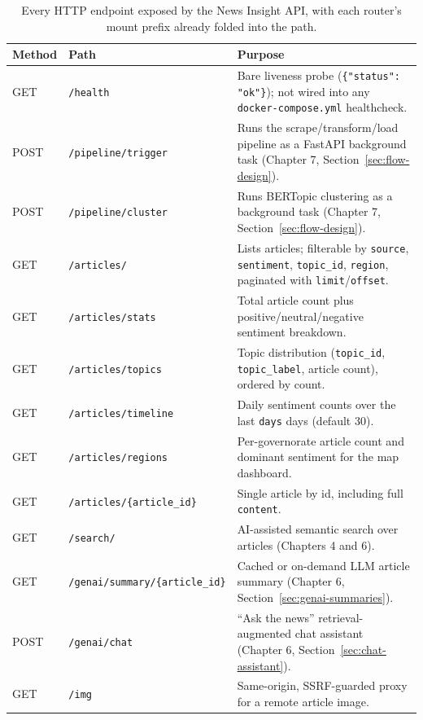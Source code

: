 \begin{table}[H]
\centering
\begin{tabular}{|p{1.7cm}|p{4.6cm}|p{7.6cm}|}
\hline
\textbf{Method} & \textbf{Path} & \textbf{Purpose} \\
\hline
GET & \texttt{/health} & Bare liveness probe (\texttt{\{"status": "ok"\}}); not wired into any \texttt{docker-compose.yml} healthcheck. \\
\hline
POST & \texttt{/pipeline/\allowbreak trigger} & Runs the scrape/transform/load pipeline as a FastAPI background task (Chapter 7, Section~\ref{sec:flow-design}). \\
\hline
POST & \texttt{/pipeline/\allowbreak cluster} & Runs BERTopic clustering as a background task (Chapter 7, Section~\ref{sec:flow-design}). \\
\hline
GET & \texttt{/articles/} & Lists articles; filterable by \texttt{source}, \texttt{sentiment}, \texttt{topic\_id}, \texttt{region}, paginated with \texttt{limit}/\texttt{offset}. \\
\hline
GET & \texttt{/articles/\allowbreak stats} & Total article count plus positive/neutral/negative sentiment breakdown. \\
\hline
GET & \texttt{/articles/\allowbreak topics} & Topic distribution (\texttt{topic\_id}, \texttt{topic\_label}, article count), ordered by count. \\
\hline
GET & \texttt{/articles/\allowbreak timeline} & Daily sentiment counts over the last \texttt{days} days (default 30). \\
\hline
GET & \texttt{/articles/\allowbreak regions} & Per-governorate article count and dominant sentiment for the map dashboard. \\
\hline
GET & \texttt{/articles/\allowbreak\{article\_id\}} & Single article by id, including full \texttt{content}. \\
\hline
GET & \texttt{/search/} & AI-assisted semantic search over articles (Chapters 4 and 6). \\
\hline
GET & \texttt{/genai/\allowbreak summary/\allowbreak\{article\_id\}} & Cached or on-demand LLM article summary (Chapter 6, Section~\ref{sec:genai-summaries}). \\
\hline
POST & \texttt{/genai/\allowbreak chat} & ``Ask the news'' retrieval-augmented chat assistant (Chapter 6, Section~\ref{sec:chat-assistant}). \\
\hline
GET & \texttt{/img} & Same-origin, SSRF-guarded proxy for a remote article image. \\
\hline
\end{tabular}
\caption{Every HTTP endpoint exposed by the News Insight API, with each router's mount prefix already folded into the path.}
\label{tab:endpoints}
\end{table}

